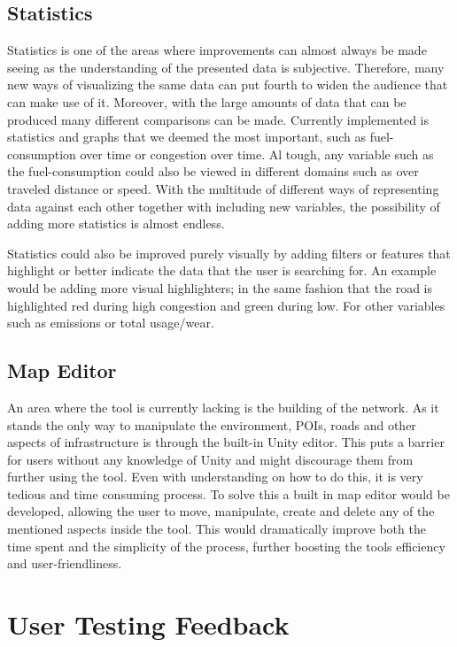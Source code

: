     \subsection{Statistics}
        Statistics is one of the areas where improvements can almost always be made seeing as the understanding of the presented data is subjective. Therefore, many new ways of visualizing the same data can put fourth to widen the audience that can make use of it. Moreover, with the large amounts of data that can be produced many different comparisons can be made. Currently implemented is statistics and graphs that we deemed the most important, such as fuel-consumption over time or congestion over time. Al tough, any variable such as the fuel-consumption could also be viewed in different domains such as over traveled distance or speed. With the multitude of different ways of representing data against each other together with including new variables, the possibility of adding more statistics is almost endless.

        Statistics could also be improved purely visually by adding filters or features that highlight or better indicate the data that the user is searching for. An example would be adding more visual highlighters; in the same fashion that the road is highlighted red during high congestion and green during low. For other variables such as emissions or total usage/wear. 

    \subsection{Map Editor}
        An area where the tool is currently lacking is the building of the network. As it stands the only way to manipulate the environment, POIs, roads and other aspects of infrastructure is through the built-in Unity editor. This puts a barrier for users without any knowledge of Unity and might discourage them from further using the tool. Even with understanding on how to do this, it is very tedious and time consuming process. To solve this a built in map editor would be developed, allowing the user to move, manipulate, create and delete any of the mentioned aspects inside the tool. This would dramatically improve both the time spent and the simplicity of the process, further boosting the tools efficiency and user-friendliness.

\section{User Testing Feedback}

